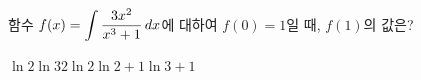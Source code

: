 함수 $f(x)=\displaystyle\int\dfrac{3x^2}{x^3+1}\mkern3mu dx$에 대하여 $f(0)=1$일 때, $f(1)$의 값은?
\begin{choices32}{$\ln 2$}{$\ln 3$}{$2\ln 2$}{$\ln 2+1$}{$\ln 3+1$}\end{choices32}
